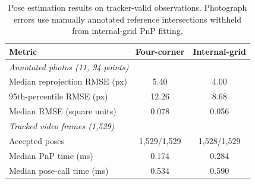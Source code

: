 \begin{table}[t]
\centering
\caption{Pose estimation results on tracker-valid observations. Photograph errors use manually annotated reference intersections withheld from internal-grid PnP fitting.}
\label{tab:pose_results}
\small
\begin{tabular}{lcc}
\toprule
Metric & Four-corner & Internal-grid \\
\midrule
\multicolumn{3}{l}{\emph{Annotated photos (11, 94 points)}} \\
Median reprojection RMSE (px) & 5.40 & 4.00 \\
95th-percentile RMSE (px) & 12.26 & 8.68 \\
Median RMSE (square units) & 0.078 & 0.056 \\
\midrule
\multicolumn{3}{l}{\emph{Tracked video frames (1,529)}} \\
Accepted poses & 1,529/1,529 & 1,528/1,529 \\
Median PnP time (ms) & 0.174 & 0.284 \\
Median pose-call time (ms) & 0.534 & 0.590 \\
\bottomrule
\end{tabular}
\end{table}
